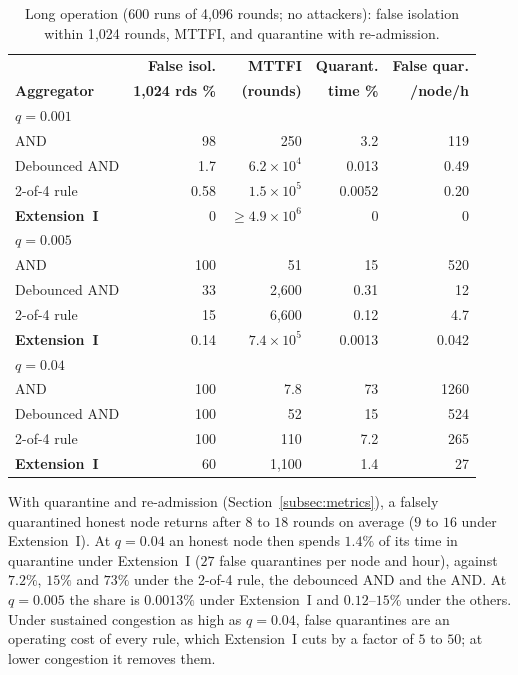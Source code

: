\documentclass{ieeeaccess}
\begin{document}
\begin{table}[!t]
\caption{Long operation (600 runs of 4{,}096 rounds; no attackers): false isolation within 1{,}024 rounds, MTTFI, and quarantine with re-admission.}
\label{tab:long}
\centering
\renewcommand{\arraystretch}{1.08}
\footnotesize
\setlength{\tabcolsep}{2.4pt}
\begin{tabular}{lrrrr}
\toprule
 & \textbf{False isol.} & \textbf{MTTFI} & \textbf{Quarant.} & \textbf{False quar.} \\
\textbf{Aggregator} & \textbf{1{,}024 rds \%} & \textbf{(rounds)} & \textbf{time \%} & \textbf{/node/h} \\
\midrule
\multicolumn{5}{l}{$q=0.001$} \\
AND~\cite{soula2024iodt} & 98 & 250 & 3.2 & 119 \\
Debounced AND & 1.7 & $6.2\times10^{4}$ & 0.013 & 0.49 \\
2-of-4 rule & 0.58 & $1.5\times10^{5}$ & 0.0052 & 0.20 \\
\textbf{Extension~I} & 0 & $\geq$$4.9\times10^{6}$ & 0 & 0 \\
\midrule
\multicolumn{5}{l}{$q=0.005$} \\
AND~\cite{soula2024iodt} & 100 & 51 & 15 & 520 \\
Debounced AND & 33 & 2{,}600 & 0.31 & 12 \\
2-of-4 rule & 15 & 6{,}600 & 0.12 & 4.7 \\
\textbf{Extension~I} & 0.14 & $7.4\times10^{5}$ & 0.0013 & 0.042 \\
\midrule
\multicolumn{5}{l}{$q=0.04$} \\
AND~\cite{soula2024iodt} & 100 & 7.8 & 73 & 1260 \\
Debounced AND & 100 & 52 & 15 & 524 \\
2-of-4 rule & 100 & 110 & 7.2 & 265 \\
\textbf{Extension~I} & 60 & 1{,}100 & 1.4 & 27 \\
\bottomrule
\end{tabular}
\end{table}

With quarantine and re-admission (Section~\ref{subsec:metrics}), a
falsely quarantined honest node returns after $8$ to $18$ rounds on
average ($9$ to $16$ under Extension~I).  At $q=0.04$ an honest node
then spends $1.4\%$ of its time in quarantine under Extension~I ($27$
false quarantines per node and hour), against $7.2\%$, $15\%$ and $73\%$
under the 2-of-4 rule, the debounced AND and the AND.  At $q=0.005$ the
share is $0.0013\%$ under Extension~I and $0.12$--$15\%$ under the
others.  Under sustained congestion as high as $q=0.04$, false
quarantines are an operating cost of every rule, which Extension~I cuts
by a factor of $5$ to $50$; at lower congestion it removes them.
\end{document}
